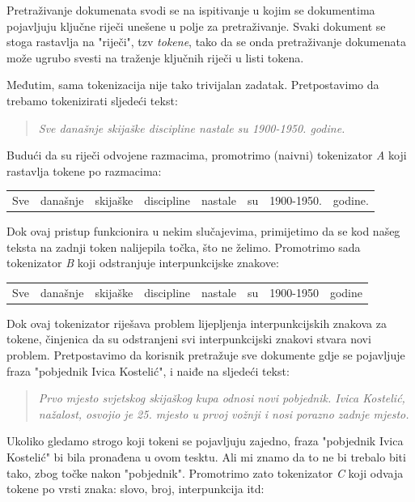 \documentclass[a4paper,twoside,12pt]{memoir}
\begin{document}
Pretraživanje dokumenata svodi se na ispitivanje u kojim se dokumentima pojavljuju ključne riječi unešene u polje za pretraživanje. Svaki dokument se stoga rastavlja na "riječi", tzv \textit{tokene}, tako da se onda pretraživanje dokumenata može ugrubo svesti na traženje ključnih riječi u listi tokena.

Međutim, sama tokenizacija nije tako trivijalan zadatak. Pretpostavimo da trebamo tokenizirati sljedeći tekst:

\begin{quote}
  \textit{Sve današnje skijaške discipline nastale su 1900-1950. godine.}
\end{quote}

Budući da su riječi odvojene razmacima, promotrimo (naivni) tokenizator \textit{A} koji rastavlja tokene po razmacima:

\begin{center}
  \begin{tabular}{|c|c|c|c|c|c|c|c|}
    Sve & današnje & skijaške & discipline & nastale & su & 1900-1950. & godine.
  \end{tabular}
\end{center}

Dok ovaj pristup funkcionira u nekim slučajevima, primijetimo da se kod našeg teksta na zadnji token nalijepila točka, što ne želimo. Promotrimo sada tokenizator \textit{B} koji odstranjuje interpunkcijske znakove:

\begin{center}
  \begin{tabular}{|c|c|c|c|c|c|c|c|}
    Sve & današnje & skijaške & discipline & nastale & su & 1900-1950 & godine
  \end{tabular}
\end{center}

Dok ovaj tokenizator riješava problem lijepljenja interpunkcijskih znakova za tokene, činjenica da su odstranjeni svi interpunkcijski znakovi stvara novi problem. Pretpostavimo da korisnik pretražuje sve dokumente gdje se pojavljuje fraza "pobjednik Ivica Kostelić", i naiđe na sljedeći tekst:

\begin{quote}
  \textit{Prvo mjesto svjetskog skijaškog kupa odnosi novi pobjednik. Ivica Kostelić, nažalost, osvojio je 25. mjesto u prvoj vožnji i nosi porazno zadnje mjesto.}
\end{quote}

Ukoliko gledamo strogo koji tokeni se pojavljuju zajedno, fraza "pobjednik Ivica Kostelić" bi bila pronađena u ovom tesktu. Ali mi znamo da to ne bi trebalo biti tako, zbog točke nakon "pobjednik". Promotrimo zato tokenizator \textit{C} koji odvaja tokene po vrsti znaka: slovo, broj, interpunkcija itd:
\end{document}

